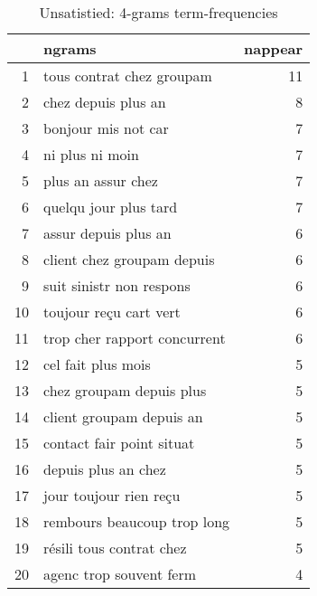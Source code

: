 \begin{table}[ht]
\centering
\begin{tabular}{rlr}
  \hline
 & ngrams & nappear \\ 
  \hline
1 & tous contrat chez groupam &  11 \\ 
  2 & chez depuis plus an &   8 \\ 
  3 & bonjour mis not car &   7 \\ 
  4 & ni plus ni moin &   7 \\ 
  5 & plus an assur chez &   7 \\ 
  6 & quelqu jour plus tard &   7 \\ 
  7 & assur depuis plus an &   6 \\ 
  8 & client chez groupam depuis &   6 \\ 
  9 & suit sinistr non respons &   6 \\ 
  10 & toujour reçu cart vert &   6 \\ 
  11 & trop cher rapport concurrent &   6 \\ 
  12 & cel fait plus mois &   5 \\ 
  13 & chez groupam depuis plus &   5 \\ 
  14 & client groupam depuis an &   5 \\ 
  15 & contact fair point situat &   5 \\ 
  16 & depuis plus an chez &   5 \\ 
  17 & jour toujour rien reçu &   5 \\ 
  18 & rembours beaucoup trop long &   5 \\ 
  19 & résili tous contrat chez &   5 \\ 
  20 & agenc trop souvent ferm &   4 \\ 
   \hline
\end{tabular}
\caption{Unsatistied: 4-grams term-frequencies} 
\label{tab:tf_inf_4}
\end{table}
